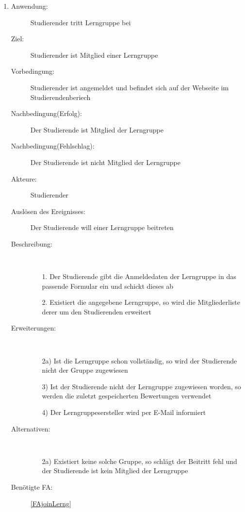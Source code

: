 \documentclass[parskip=full]{scrartcl}
\newcommand{\swtLabel}[1]{\textbf{/#1\arabic*0/}}
\begin{document}
\begin{enumerate}[label=\swtLabel{S}]
  
  \item \label{UCstudJoinLernG}
  \begin{description}
  \item[Anwendung:] Studierender tritt \gls{Lerngruppe} bei
  \item[Ziel:] Studierender ist Mitglied einer \gls{Lerngruppe}
  	\item[Vorbedingung:] Studierender ist angemeldet und befindet sich auf der
  	Webseite im Studierendenberiech
  	\item[Nachbedingung(Erfolg):] Der Studierende ist Mitglied der
  	\gls{Lerngruppe}
  	\item[Nachbedingung(Fehlschlag):] Der Studierende ist nicht Mitglied der
  	\gls{Lerngruppe}
  	\item[Akteure:] Studierender
  	\item[Auslösen des Ereignisses:] Der Studierende will einer \gls{Lerngruppe}
  	beitreten
  	\item[Beschreibung:]~
  	\begin{enumerate}
  	  \item[1.] Der Studierende gibt die Anmeldedaten der \gls{Lerngruppe} in das
  	  passende Formular ein und schickt dieses ab %
  	  \item[2.] Existiert die angegebene \gls{Lerngruppe}, so wird die
  	  Mitgliederliste derer um den Studierenden erweitert
  	\end{enumerate}
  	\item[Erweiterungen:]~
  	\begin{enumerate}
  	  \item[2a)] Ist die \gls{Lerngruppe} schon vollständig, so wird der
  	  Studierende nicht der Gruppe zugewiesen
  	  \item[3)] Ist der Studierende nicht der \gls{Lerngruppe} zugewiesen worden,
  	  so werden die zuletzt gespeicherten Bewertungen verwendet
  	  \item[4)] Der \glspl{Lerngruppe}ersteller wird per E-Mail informiert
  	 \end{enumerate}
  	\item[Alternativen:] ~
  	\begin{enumerate}
  	  \item[2a)] Existiert keine solche Gruppe, so schlägt der Beitritt fehl und
  	  der Studierende ist kein Mitglied der \gls{Lerngruppe}
  	 \end{enumerate}
  	 \item[Benötigte FA:] \ref{FAjoinLerng}
  \end{description}
  

\end{enumerate}
\end{document}
